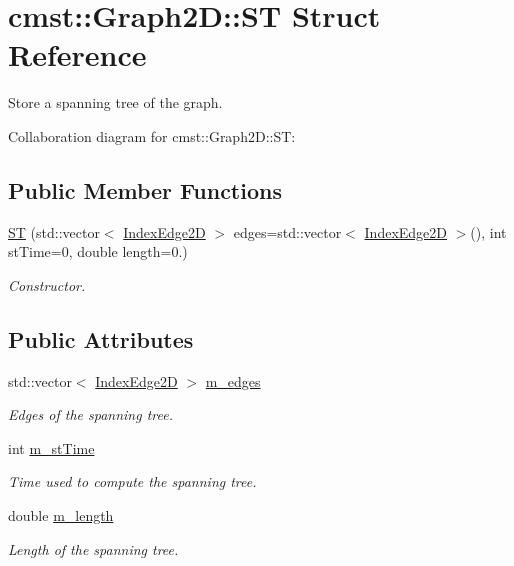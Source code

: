\hypertarget{structcmst_1_1_graph2_d_1_1_s_t}{}\section{cmst\+:\+:Graph2D\+:\+:ST Struct Reference}
\label{structcmst_1_1_graph2_d_1_1_s_t}


Store a spanning tree of the graph.  




Collaboration diagram for cmst\+:\+:Graph2D\+:\+:ST\+:
\subsection*{Public Member Functions}
\begin{DoxyCompactItemize}
\item 
\hyperlink{structcmst_1_1_graph2_d_1_1_s_t_a1664ad2ca7aeff224949d7ca06e5d8e1}{ST} (std\+::vector$<$ \hyperlink{classcmst_1_1_index_edge2_d}{Index\+Edge2D} $>$ edges=std\+::vector$<$ \hyperlink{classcmst_1_1_index_edge2_d}{Index\+Edge2D} $>$(), int st\+Time=0, double length=0.)
\begin{DoxyCompactList}\small\item\em Constructor. \end{DoxyCompactList}\end{DoxyCompactItemize}
\subsection*{Public Attributes}
\begin{DoxyCompactItemize}
\item 
std\+::vector$<$ \hyperlink{classcmst_1_1_index_edge2_d}{Index\+Edge2D} $>$ \hyperlink{structcmst_1_1_graph2_d_1_1_s_t_a629248d1f9b4b5bc583a7813ae852095}{m\+\_\+edges}
\begin{DoxyCompactList}\small\item\em Edges of the spanning tree. \end{DoxyCompactList}\item 
int \hyperlink{structcmst_1_1_graph2_d_1_1_s_t_ad3201db988690542cc7ef7ddff9525cc}{m\+\_\+st\+Time}
\begin{DoxyCompactList}\small\item\em Time used to compute the spanning tree. \end{DoxyCompactList}\item 
double \hyperlink{structcmst_1_1_graph2_d_1_1_s_t_a954af452de884ab5a96ef6a396b9d531}{m\+\_\+length}
\begin{DoxyCompactList}\small\item\em Length of the spanning tree. \end{DoxyCompactList}\end{DoxyCompactItemize}


